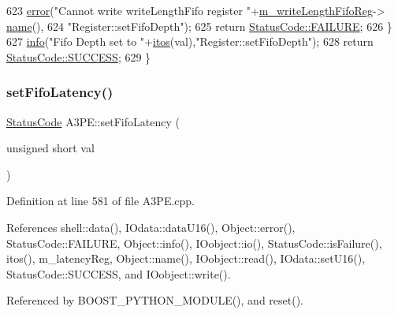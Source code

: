 \begin{DoxyCode}
623     \hyperlink{classObject_a204a95f57818c0f811933917a30eff45}{error}(\textcolor{stringliteral}{"Cannot write writeLengthFifo register "}+\hyperlink{classA3PE_a9a0cb2253ea34c0be567a03684217fee}{m\_writeLengthFifoReg}->
      \hyperlink{classObject_a300f4c05dd468c7bb8b3c968868443c1}{name}(),
624         \textcolor{stringliteral}{"Register::setFifoDepth"});
625     \textcolor{keywordflow}{return} \hyperlink{classStatusCode_a6f565cbeadc76d14c72f047e5e85eb4ba3da73d4c469762eb9d3c960368252b26}{StatusCode::FAILURE};
626   \}
627   \hyperlink{classObject_a644fd329ea4cb85f54fa6846484b84a8}{info}(\textcolor{stringliteral}{"Fifo Depth set to "}+\hyperlink{Tools_8h_af330027dbdafb9a30768b3613c553e60}{itos}(val),\textcolor{stringliteral}{"Register::setFifoDepth"});
628   \textcolor{keywordflow}{return} \hyperlink{classStatusCode_a6f565cbeadc76d14c72f047e5e85eb4badd0da38d3ba0d922efd1f4619bc37ad8}{StatusCode::SUCCESS};
629 \}
\end{DoxyCode}
\mbox{\label{classA3PE_a969469569005dfb130aca674de5dacff}} 
\subsubsection{\texorpdfstring{set\+Fifo\+Latency()}{setFifoLatency()}}
{\footnotesize\ttfamily \hyperlink{classStatusCode}{Status\+Code} A3\+P\+E\+::set\+Fifo\+Latency (\begin{DoxyParamCaption}\item[{unsigned short}]{val }\end{DoxyParamCaption})}



Definition at line 581 of file A3\+P\+E.\+cpp.



References shell\+::data(), I\+Odata\+::data\+U16(), Object\+::error(), Status\+Code\+::\+F\+A\+I\+L\+U\+RE, Object\+::info(), I\+Oobject\+::io(), Status\+Code\+::is\+Failure(), itos(), m\+\_\+latency\+Reg, Object\+::name(), I\+Oobject\+::read(), I\+Odata\+::set\+U16(), Status\+Code\+::\+S\+U\+C\+C\+E\+SS, and I\+Oobject\+::write().



Referenced by B\+O\+O\+S\+T\+\_\+\+P\+Y\+T\+H\+O\+N\+\_\+\+M\+O\+D\+U\+L\+E(), and reset().


